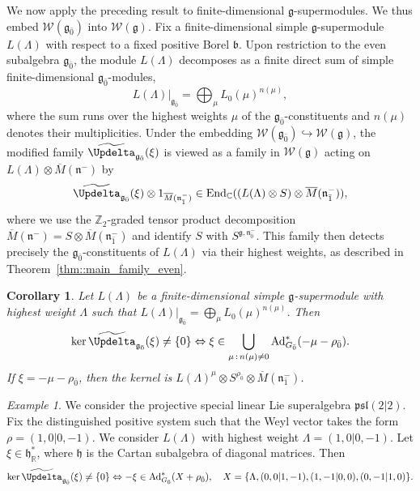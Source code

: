 \documentclass[11pt]{amsart}
\newcommand{\End}{\operatorname{End}}
\def\WW{{\mathcal{W}}}
\def\Weil{{\mathcal{W}(\gg)}}
\def\CC{{\mathbb C}}
\def\RR{{\mathbb R}}
\def\hh{{\mathfrak h}}
\def\bb{{\mathfrak b}}
\def\even{{\mathfrak{g}_{\bar{0}}}}
\def\nn {{\mathfrak{n}}}
\def\gg{{\mathfrak{g}}}
\def\ZZ{{\mathbb Z}}
\newcommand{\Ad}{\operatorname{Ad}}
\theoremstyle{plain}
\newtheorem{corollary}[theorem]{Corollary}
\theoremstyle{remark}
\newtheorem{example}[theorem]{Example}
\theoremstyle{definition}
\numberwithin{equation}{section}
\theoremstyle{remark}
\begin{document}
We now apply the preceding result to finite-dimensional $\gg$-supermodules. We thus embed $\mathcal{W}(\even)$ into $\mathcal{W}(\gg)$. Fix a
finite-dimensional simple $\gg$-supermodule $L(\Lambda)$ with respect to a fixed
positive Borel $\bb$. Upon restriction to the even subalgebra $\even$,
the module $L(\Lambda)$ decomposes as a finite direct sum of simple
finite-dimensional $\even$-modules,
\begin{equation}
L(\Lambda)\Big\vert_{\even}=\bigoplus_{\mu}L_{0}(\mu)^{n(\mu)},
\end{equation}
where the sum runs over the highest weights $\mu$ of the $\even$-constituents and
$n(\mu)$ denotes their multiplicities. Under the embedding $\WW(\even)\hookrightarrow \Weil$, the modified family
$\widetilde{\Updelta}_{\even}(\xi)$ is viewed as a family in $\Weil$
acting on $L(\Lambda)\otimes \overline{M}(\nn^{-})$ by
\begin{equation} \label{eq::action_Laplace_tilde}
\widetilde{\Updelta}_{\even}(\xi) \otimes 1_{\overline{M}(\nn_{\bar{1}}^{-})} \in \End_{\CC}((L(\Lambda)\otimes S)\otimes \overline{M}(\nn_{\bar{1}}^{-})),
\end{equation}
where we use the $\ZZ_{2}$-graded tensor product decomposition
$\overline{M}(\nn^{-})=S\otimes \overline{M}(\nn_{\bar{1}}^{-})$
and identify $S$ with $S^{\gg,\nn_{\bar{0}}^{-}}$. This family then detects precisely the $\even$-constituents of $L(\Lambda)$ via their highest
weights, as described in Theorem~\ref{thm::main_family_even}.

\begin{corollary} \label{cor::kernel_Laplace_even_constituents}
 Let $L(\Lambda)$ be a finite-dimensional simple $\gg$-supermodule with highest weight $\Lambda$ such that $L(\Lambda)\big\vert_{\even}=\bigoplus_{\mu} L_{0}(\mu)^{n(\mu)}$. Then 
 \[
 \ker \widetilde{\Updelta}_{\even}(\xi) \neq \{0\} \Leftrightarrow \xi \in \bigcup_{\mu \,:\, n(\mu)\neq 0}\Ad_{G_{\bar{0}}}^{\ast}(-\mu-\rho_{\bar{0}}).
 \]
 If $\xi=- \mu-\rho_{\bar{0}}$, then the kernel is $L(\Lambda)^{\mu}\otimes S^{\rho_{\bar{0}}} \otimes \overline{M}(\nn_{\bar{1}}^{-})$.
\end{corollary}

\begin{example} We consider the projective special linear Lie superalgebra $\mathfrak{psl}(2\vert 2)$. Fix the distinguished positive system such that the Weyl vector takes the form $\rho=(1,0\vert 0,-1)$. We consider $L(\Lambda)$ with highest weight $\Lambda=(1,0\vert 0,-1)$. Let $\xi \in \hh_{\RR}^{\ast}$, where $\hh$ is the Cartan subalgebra of diagonal matrices. Then 
\[
\ker \widetilde{\Updelta}_{\even}(\xi) \neq \{0\} \Leftrightarrow -\xi \in \Ad_{G_{\bar{0}}}^{\ast}(X+\rho_{\bar{0}}), \quad X=\{\Lambda, (0,0\vert 1,-1), (1,-1\vert 0,0), (0,-1\vert 1,0)\}.
\]
\end{example}
\end{document}
